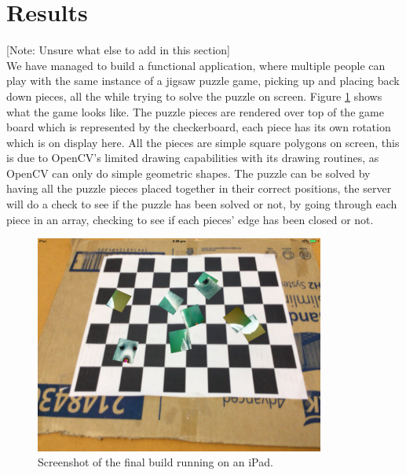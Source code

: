 \documentclass{article}
\begin{document}

\section{Results}
[Note: Unsure what else to add in this section]\\

We have managed to build a functional application, where multiple people can
play with the same instance of a jigsaw puzzle game, picking up and placing back
down pieces, all the while trying to solve the puzzle on screen. Figure
\ref{fig:iPadFinal} shows what the game looks like. The puzzle pieces are
rendered over top of the game board which is represented by the checkerboard,
each piece has its own rotation which is on display here. All the pieces are
simple square polygons on screen, this is due to OpenCV's limited drawing
capabilities with its drawing routines, as OpenCV can only do simple geometric
shapes. The puzzle can be solved by having all the puzzle pieces placed together
in their correct positions, the server will do a check to see if the puzzle has
been solved or not, by going through each piece in an array, checking to see if
each pieces' edge has been closed or not.

\begin{figure}[ht]
\begin{center}
\includegraphics[width=0.85\textwidth]{images/iPadFinalImage}
\caption{Screenshot of the final build running on an iPad.}
\label{fig:iPadFinal}
\end{center}
\end{figure}
\end{document}
